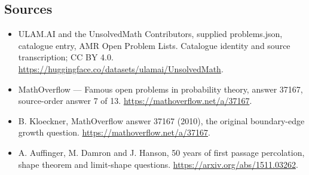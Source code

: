 \documentclass[11pt,a4paper]{article}
\begin{document}
\subsection{Sources}
\begin{itemize}
\item[S1] ULAM.AI and the UnsolvedMath Contributors, supplied problems.json, catalogue entry, AMR Open Problem Lists. Catalogue identity and source transcription; CC BY 4.0.
\url{https://huggingface.co/datasets/ulamai/UnsolvedMath}.
\item[S2] MathOverflow — Famous open problems in probability theory, answer 37167, source-order answer 7 of 13. 
\url{https://mathoverflow.net/a/37167}.
\item[S3] B. Kloeckner, MathOverflow answer 37167 (2010), the original boundary-edge growth question.
\url{https://mathoverflow.net/a/37167}.
\item[S4] A. Auffinger, M. Damron and J. Hanson, 50 years of first passage percolation, shape theorem and limit-shape questions.
\url{https://arxiv.org/abs/1511.03262}.
\end{itemize}
\end{document}
